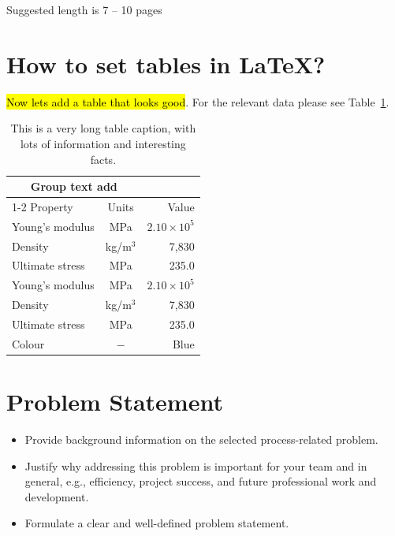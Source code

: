\noindent Suggested length is 7 – 10 pages

\section{How to set tables in \LaTeX?}

\hl{Now lets add a table that looks good}. For the relevant data please see Table~\ref{tab:nicetable}.

\begin{table}[htbp]
  \centering
  \caption[This is the short table caption]{This is a very long table caption, with lots of information and interesting facts.}
  \label{tab:nicetable}
  \begin{tabular}{lcr}  \toprule   %
      \multicolumn{2}{c}{Group text add}            \\ \cmidrule(r){1-2}
      Property \hspace{35mm}      & Units    & Value   \\ \midrule
      Young's modulus  & MPa      & $2.10\times 10^5$  \\ 
      Density          & kg/m$^3$ & 7,830              \\
      Ultimate stress  & MPa      & 235.0              \\
      Young's modulus  & MPa      & $2.10\times 10^5$  \\
      Density          & kg/m$^3$ & 7,830              \\
      Ultimate stress  & MPa      & 235.0              \\
      Colour           & $-$      & Blue               \\ \bottomrule
  \end{tabular}
\end{table}

\section{Problem Statement}

\begin{itemize}

    \item [-] Provide background information on the selected process-related problem.
    \item [-] Justify why addressing this problem is important for your team and in general, e.g., efficiency, project success, and future professional work and development.
    \item [-] Formulate a clear and well-defined problem statement.
  
\end{itemize}

